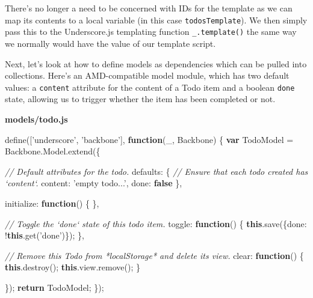 \documentclass[9pt]{book}
\newenvironment{Shaded}{}{}
\newcommand{\KeywordTok}[1]{\textcolor[rgb]{0.00,0.44,0.13}{\textbf{{#1}}}}
\newcommand{\DataTypeTok}[1]{\textcolor[rgb]{0.56,0.13,0.00}{{#1}}}
\newcommand{\StringTok}[1]{\textcolor[rgb]{0.25,0.44,0.63}{{#1}}}
\newcommand{\CommentTok}[1]{\textcolor[rgb]{0.38,0.63,0.69}{\textit{{#1}}}}
\newcommand{\OtherTok}[1]{\textcolor[rgb]{0.00,0.44,0.13}{{#1}}}
\newcommand{\FunctionTok}[1]{\textcolor[rgb]{0.02,0.16,0.49}{{#1}}}
\newcommand{\NormalTok}[1]{{#1}}
\begin{document}
There's no longer a need to be concerned with IDs for the template as we
can map its contents to a local variable (in this case
\texttt{todosTemplate}). We then simply pass this to the Underscore.js
templating function \texttt{\_.template()} the same way we normally
would have the value of our template script.

Next, let's look at how to define models as dependencies which can be
pulled into collections. Here's an AMD-compatible model module, which
has two default values: a \texttt{content} attribute for the content of
a Todo item and a boolean \texttt{done} state, allowing us to trigger
whether the item has been completed or not.

\textbf{models/todo.js}

\begin{Shaded}
\begin{Highlighting}[]
\FunctionTok{define}\NormalTok{([}\StringTok{'underscore'}\NormalTok{, }\StringTok{'backbone'}\NormalTok{], }\KeywordTok{function}\NormalTok{(_, Backbone) \{}
  \KeywordTok{var} \NormalTok{TodoModel = }\OtherTok{Backbone}\NormalTok{.}\OtherTok{Model}\NormalTok{.}\FunctionTok{extend}\NormalTok{(\{}

    \CommentTok{// Default attributes for the todo.}
    \DataTypeTok{defaults}\NormalTok{: \{}
      \CommentTok{// Ensure that each todo created has `content`.}
      \DataTypeTok{content}\NormalTok{: }\StringTok{'empty todo...'}\NormalTok{,}
      \DataTypeTok{done}\NormalTok{: }\KeywordTok{false}
    \NormalTok{\},}

    \DataTypeTok{initialize}\NormalTok{: }\KeywordTok{function}\NormalTok{() \{}
    \NormalTok{\},}

    \CommentTok{// Toggle the `done` state of this todo item.}
    \DataTypeTok{toggle}\NormalTok{: }\KeywordTok{function}\NormalTok{() \{}
      \KeywordTok{this}\NormalTok{.}\FunctionTok{save}\NormalTok{(\{}\DataTypeTok{done}\NormalTok{: !}\KeywordTok{this}\NormalTok{.}\FunctionTok{get}\NormalTok{(}\StringTok{'done'}\NormalTok{)\});}
    \NormalTok{\},}

    \CommentTok{// Remove this Todo from *localStorage* and delete its view.}
    \DataTypeTok{clear}\NormalTok{: }\KeywordTok{function}\NormalTok{() \{}
      \KeywordTok{this}\NormalTok{.}\FunctionTok{destroy}\NormalTok{();}
      \KeywordTok{this}\NormalTok{.}\OtherTok{view}\NormalTok{.}\FunctionTok{remove}\NormalTok{();}
    \NormalTok{\}}

  \NormalTok{\});}
  \KeywordTok{return} \NormalTok{TodoModel;}
\NormalTok{\});}
\end{Highlighting}
\end{Shaded}
\end{document}
